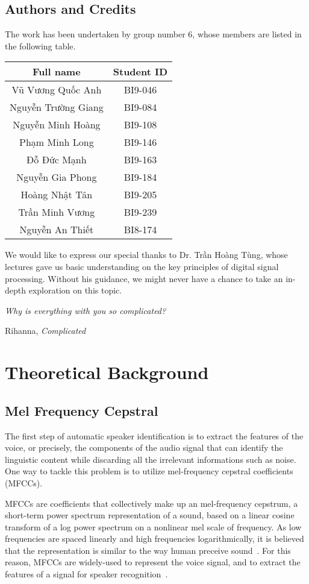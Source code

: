\documentclass[a4paper,12pt]{article}
\begin{document}
\subsection{Authors and Credits}
The work has been undertaken by group number 6, whose members are listed
in the following table.
\begin{center}
  \begin{tabular}{c c}
    \toprule
    Full name & Student ID\\
    \midrule
    Vũ Vương Quốc Anh & BI9-046\\
    Nguyễn Trường Giang & BI9-084\\
    Nguyễn Minh Hoàng & BI9-108\\
    Phạm Minh Long & BI9-146\\
    Đỗ Đức Mạnh & BI9-163\\
    Nguyễn Gia Phong & BI9-184\\
    Hoàng Nhật Tân & BI9-205\\
    Trần Minh Vương & BI9-239\\
    Nguyễn An Thiết & BI8-174\\
    \bottomrule
  \end{tabular}
\end{center}

We would like to express our special thanks to Dr. Trần Hoàng Tùng,
whose lectures gave us basic understanding on the key principles of
digital signal processing.  Without his guidance, we might never
have a chance to take an in-depth exploration on this topic.
\pagebreak

\setlength{}
\epigraph{\textit{Why is everything with you so complicated?}}
         {Rihanna, \textit{Complicated}}
\section{Theoretical Background}
\subsection{Mel Frequency Cepstral}
The first step of automatic speaker identification is to extract the features
of the voice, or precisely, the components of the audio signal that can
identify the linguistic content while discarding all the irrelevant
informations such as noise.  One way to tackle this problem is to utilize
mel-frequency cepstral coefficients (MFCCs).

MFCCs are coefficients that collectively make up an mel-frequency cepstrum,
a short-term power spectrum representation of a sound, based on a linear
cosine transform of a log power spectrum on a nonlinear mel scale of frequency.
As low frequencies are spaced linearly and high frequencies logarithmically,
it is believed that the representation is similar to the way human preceive
sound~\cite{psy}.  For this reason, MFCCs are widely-used to represent
the voice signal, and to extract the features of a signal for speaker
recognition~\cite{mfcpop}.
\end{document}

